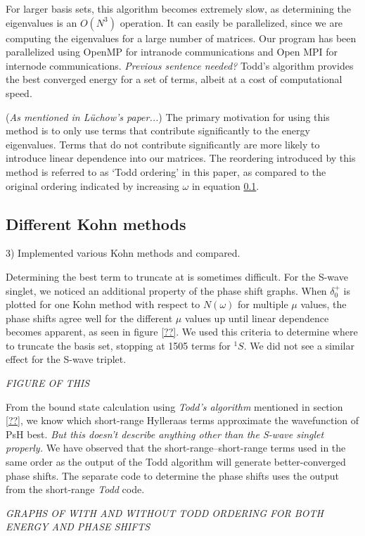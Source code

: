 \documentclass[preprint,showpacs,preprintnumbers,amsmath,amssymb]{revtex4}
\begin{document}
For larger basis sets, this algorithm becomes extremely slow, as determining the eigenvalues is an $O(N^3)$ operation.  It can easily be parallelized, since we are computing the eigenvalues for a large number of matrices. Our program has been parallelized using OpenMP for intranode communications and Open MPI for internode communications. \emph{Previous sentence needed?} Todd's algorithm provides the best converged energy for a set of terms, albeit at a cost of computational speed.

(\emph{As mentioned in L\"uchow's paper...}) The primary motivation for using this method is to only use terms that contribute significantly to the energy eigenvalues. Terms that do not contribute significantly are more likely to introduce linear dependence into our matrices. The reordering introduced by this method is referred to as `Todd ordering' in this paper, as compared to the original ordering indicated by increasing $\omega$ in equation \ref{}.

\subsection{Different Kohn methods}
3) Implemented various Kohn methods and compared.

Determining the best term to truncate at is sometimes difficult. For the S-wave singlet, we noticed an additional property of the phase shift graphs. When $\delta_0^+$ is plotted for one Kohn method with respect to $N(\omega)$ for multiple $\mu$ values, the phase shifts agree well for the different $\mu$ values up until linear dependence becomes apparent, as seen in figure \ref{??}. We used this criteria to determine where to truncate the basis set, stopping at 1505 terms for $^1S$. We did not see a similar effect for the S-wave triplet.

\emph{FIGURE OF THIS}

From the bound state calculation using \emph{Todd's algorithm} mentioned in section \ref{??}, we know which short-range Hylleraas terms approximate the wavefunction of PsH best. \emph{But this doesn't describe anything other than the S-wave singlet properly.} We have observed that the short-range--short-range terms used in the same order as the output of the Todd algorithm will generate better-converged phase shifts. The separate code to determine the phase shifts uses the output from the short-range \emph{Todd} code.

\emph{GRAPHS OF WITH AND WITHOUT TODD ORDERING FOR BOTH ENERGY AND PHASE SHIFTS}
\end{document}
